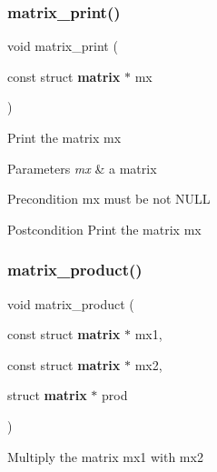 \subsubsection{matrix\+\_\+print()}
{\footnotesize\ttfamily void matrix\+\_\+print (\begin{DoxyParamCaption}\item[{const struct \textbf{ matrix} $\ast$}]{mx }\end{DoxyParamCaption})}

Print the matrix {\ttfamily mx}


\begin{DoxyParams}{Parameters}
{\em mx} & a matrix\\
\hline
\end{DoxyParams}
\begin{DoxyPrecond}{Precondition}
{\ttfamily mx} must be not N\+U\+LL
\end{DoxyPrecond}
\begin{DoxyPostcond}{Postcondition}
Print the matrix {\ttfamily mx} 
\end{DoxyPostcond}
\mbox{\label{matrix_8h_a48e828fb00afc50e3616adefe87643bf}} 
\subsubsection{matrix\+\_\+product()}
{\footnotesize\ttfamily void matrix\+\_\+product (\begin{DoxyParamCaption}\item[{const struct \textbf{ matrix} $\ast$}]{mx1,  }\item[{const struct \textbf{ matrix} $\ast$}]{mx2,  }\item[{struct \textbf{ matrix} $\ast$}]{prod }\end{DoxyParamCaption})}

Multiply the matrix {\ttfamily mx1} with {\ttfamily mx2}



